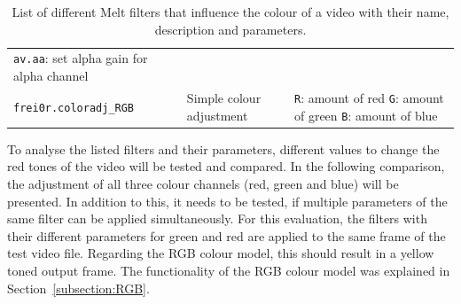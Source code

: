\documentclass[../MasterThesis.tex]{subfiles}
\begin{document}
\begin{table}[H]
\begin{tabular}{lp{4.4cm}p{4.5cm}}
{		\texttt{av.aa}: set alpha gain for alpha channel}
		\\
		\texttt{frei0r.coloradj\_RGB} & Simple colour adjustment & 
		\tiny{
		\texttt{R}: amount of red \newline 
		\texttt{G}: amount of green \newline 
		\texttt{B}: amount of blue}
		\\
		\bottomrule
	\end{tabular}
	\caption[List of Melt filters that influence the colour of a video.]{List of different Melt filters that influence the colour of a video with their name, description and parameters.}
	\label{table:filter}
\end{table}






%


To analyse the listed filters and their parameters, different values to change the red tones of the video will be tested and compared. In the following comparison, the adjustment of all three colour channels (red, green and blue) will be presented.
%
In addition to this, it needs to be tested, if multiple parameters of the same filter can be applied simultaneously. For this evaluation, the filters with their different parameters for green and red are applied to the same frame of the test video file. Regarding the RGB colour model, this should result in a yellow toned output frame. The functionality of the RGB colour model was explained in Section~\ref{subsection:RGB}. 
\end{document}
